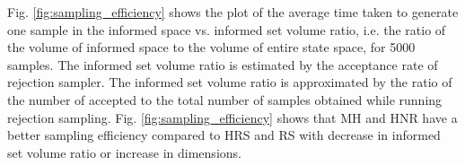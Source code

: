 \documentclass[letterpaper, 10 pt, conference]{ieeeconf}  %
\begin{document}
Fig. \ref{fig:sampling_efficiency} shows the plot of the average time taken to generate one sample in the informed space vs. informed set volume ratio, i.e. the ratio of the volume of informed space to the volume of entire state space, for 5000 samples. 
The informed set volume ratio is estimated by the acceptance rate of rejection sampler.
The informed set volume ratio is approximated by the ratio of the number of accepted to the total number of samples obtained while running rejection sampling. 
Fig. \ref{fig:sampling_efficiency} shows that MH and HNR have a better sampling efficiency compared to HRS and RS with decrease in informed set volume ratio or increase in dimensions. 
\end{document}
